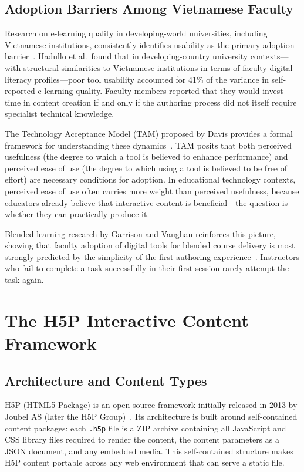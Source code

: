 \subsection{Adoption Barriers Among Vietnamese Faculty}

Research on e-learning quality in developing-world universities, including
Vietnamese institutions, consistently identifies usability as the primary
adoption barrier~\cite{hadullo2017}. Hadullo et al.\ found that in
developing-country university contexts---with structural similarities to
Vietnamese institutions in terms of faculty digital literacy profiles---poor
tool usability accounted for 41\% of the variance in self-reported e-learning
quality. Faculty members reported that they would invest time in content
creation if and only if the authoring process did not itself require
specialist technical knowledge.

The Technology Acceptance Model (TAM) proposed by Davis provides a formal
framework for understanding these dynamics~\cite{davis1989}. TAM posits that
both perceived usefulness (the degree to which a tool is believed to enhance
performance) and perceived ease of use (the degree to which using a tool is
believed to be free of effort) are necessary conditions for adoption. In
educational technology contexts, perceived ease of use often carries more
weight than perceived usefulness, because educators already believe that
interactive content is beneficial---the question is whether they can
practically produce it.

Blended learning research by Garrison and Vaughan reinforces this picture,
showing that faculty adoption of digital tools for blended course delivery
is most strongly predicted by the simplicity of the first authoring
experience~\cite{garrison2008}. Instructors who fail to complete a task
successfully in their first session rarely attempt the task again.

\section{The H5P Interactive Content Framework}

\subsection{Architecture and Content Types}

H5P (HTML5 Package) is an open-source framework initially released in 2013
by Joubel AS (later the H5P Group)~\cite{h5p2023}. Its architecture is
built around self-contained content packages: each \texttt{.h5p} file is a
ZIP archive containing all JavaScript and CSS library files required to
render the content, the content parameters as a JSON document, and any
embedded media. This self-contained structure makes H5P content portable
across any web environment that can serve a static file.

